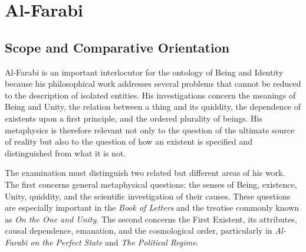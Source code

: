\section{Al-Farabi}
\label{sec:ch08_s12}




\subsection{Scope and Comparative Orientation}
\label{subsec:ch08-farabi-scope}

\label{para:VS.B01.P01.C08.S12.SS01.P001}

Al-Farabi is an important interlocutor for the ontology of
Being and Identity because his philosophical work addresses
several problems that cannot be reduced to the description
of isolated entities. His investigations concern the
meanings of Being and Unity, the relation between a thing
and its quiddity, the dependence of existents upon a first
principle, and the ordered plurality of beings. His
metaphysics is therefore relevant not only to the question
of the ultimate source of reality but also to the question
of how an existent is specified and distinguished from
what it is not.

\label{para:VS.B01.P01.C08.S12.SS01.P002}

The examination must distinguish two related but different
areas of his work. The first concerns general metaphysical
questions: the senses of Being, existence, Unity, quiddity,
and the scientific investigation of their causes. These
questions are especially important in the
\textit{Book of Letters} and the treatise commonly known
as \textit{On the One and Unity}. The second concerns
the First Existent, its attributes, causal dependence,
emanation, and the cosmological order, particularly in
\textit{Al-Farabi on the Perfect State} and
\textit{The Political Regime}.
\citep[see especially secs.~3--4]{MennAlFarabiMetaphysicsSEP2026}

